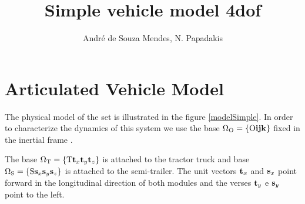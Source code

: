 \documentclass[sublist,a4paper,twoside,11pt]{article}
\author{André de Souza Mendes, N. Papadakis}
\title{Simple vehicle model 4dof }
\begin{document}
\maketitle

\tableofcontents












\section{Articulated Vehicle Model}

The physical model of the set is illustrated in the figure \ref{modelSimple}. In order to characterize the dynamics of this system we use the base \( \Omega_{\rm O} = \{ {\rm O} {\bf i} {\bf j} {\bf k} \}\) fixed in the inertial frame .

The base  \( \Omega_{\rm T} = \{ {\rm T} {\bf t}_x {\bf t}_y {\bf t}_z \}\)  is attached to the tractor truck and base \( \Omega_{\rm S} = \{ {\rm S} {\bf s}_x {\bf s}_y {\bf s}_z \}\)  is attached to the semi-trailer. The unit vectors  \({\bf t}_x\) and \({\bf s}_x\) point forward in the longitudinal direction of both modules and the verses \({\bf t}_y\) e \({\bf s}_y\) point to the left. 
\end{document}
